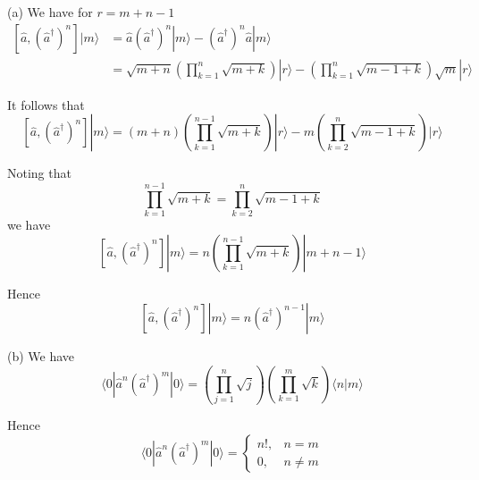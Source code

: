 


\bigskip
(a) We have for $r=m+n-1$
\begin{align*}
\left[\hat a,(\hat a^\dag)^n\right]|m\rangle
&=\hat a(\hat a^\dag)^n|m\rangle-(\hat a^\dag)^n\hat a|m\rangle
\\
&=\sqrt{m+n}\left(\prod_{k=1}^n\sqrt{m+k}\right)|r\rangle
-\left(\prod_{k=1}^n\sqrt{m-1+k}\right)\sqrt{m}|r\rangle
\end{align*}

It follows that
\begin{equation*}
\left[\hat a,(\hat a^\dag)^n\right]|m\rangle
=(m+n)\left(\prod_{k=1}^{n-1}\sqrt{m+k}\right)|r\rangle
-m\left(\prod_{k=2}^n\sqrt{m-1+k}\right)|r\rangle
\end{equation*}

Noting that
\begin{equation*}
\prod_{k=1}^{n-1}\sqrt{m+k}=\prod_{k=2}^n\sqrt{m-1+k}
\end{equation*}
we have
\begin{equation*}
\left[\hat a,(\hat a^\dag)^n\right]|m\rangle
=n\left(\prod_{k=1}^{n-1}\sqrt{m+k}\right)|m+n-1\rangle
\end{equation*}

Hence
\begin{equation*}
\left[\hat a,(\hat a^\dag)^n\right]|m\rangle=n(\hat a^\dag)^{n-1}|m\rangle
\end{equation*}

(b) We have
\begin{equation*}
\langle0|\hat a^n(\hat a^\dag)^m|0\rangle
=\left(\prod_{j=1}^n\sqrt j\right)
\left(\prod_{k=1}^m\sqrt k\right)
\langle n|m\rangle
\end{equation*}

Hence
\begin{equation*}
\langle0|\hat a^n(\hat a^\dag)^m|0\rangle
=\begin{cases}
n!, & n=m
\\
0, & n\ne m
\end{cases}
\end{equation*}

